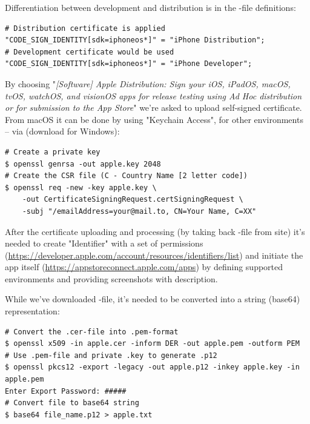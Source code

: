 Differentiation between development and distribution is in the -file definitions:

\begin{lstlisting}[language=terminal]
# Distribution certificate is applied
"CODE_SIGN_IDENTITY[sdk=iphoneos*]" = "iPhone Distribution";
# Development certificate would be used
"CODE_SIGN_IDENTITY[sdk=iphoneos*]" = "iPhone Developer";
\end{lstlisting}

\noindent By choosing "\emph{[Software] Apple Distribution: Sign your iOS, iPadOS, macOS, tvOS, watchOS, and visionOS
apps for release testing using Ad Hoc distribution or for submission to the App Store}" we're asked to upload self-signed
certificate. From macOS it can be done by using "Keychain Access", for other environments -- via  (download
 for Windows):

\begin{lstlisting}[language=terminal]
# Create a private key
$ openssl genrsa -out apple.key 2048
# Create the CSR file (C - Country Name [2 letter code])
$ openssl req -new -key apple.key \
    -out CertificateSigningRequest.certSigningRequest \
    -subj "/emailAddress=your@mail.to, CN=Your Name, C=XX"
\end{lstlisting}

\noindent After the certificate uploading and processing (by taking back -file from site) it's needed to create
"Identifier" with a set of permissions
(\href{https://developer.apple.com/account/resources/identifiers/list}{https://developer.apple.com/account/resources/identifiers/list})
and initiate the app itself
(\href{https://appstoreconnect.apple.com/apps}{https://appstoreconnect.apple.com/apps}) by defining supported
environments and providing screenshots with description.

While we've downloaded -file, it's needed to be converted into a string (base64) representation:

\begin{lstlisting}[language=terminal]
# Convert the .cer-file into .pem-format
$ openssl x509 -in apple.cer -inform DER -out apple.pem -outform PEM
# Use .pem-file and private .key to generate .p12
$ openssl pkcs12 -export -legacy -out apple.p12 -inkey apple.key -in apple.pem
Enter Export Password: #####
# Convert file to base64 string
$ base64 file_name.p12 > apple.txt
\end{lstlisting}

